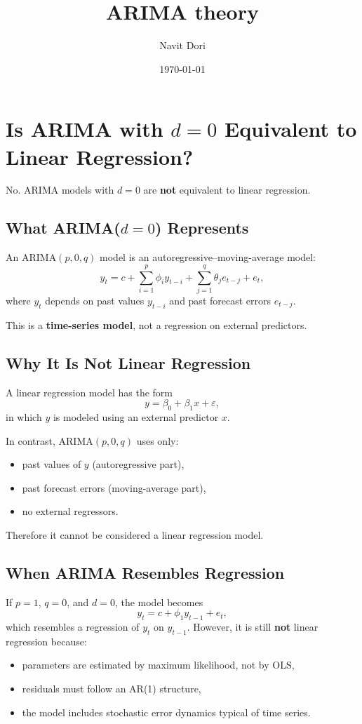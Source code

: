 \documentclass[12pt]{article}
\title{ARIMA theory}
\author{Navit Dori}
\date{\today}
\begin{document}
\maketitle
\section*{Is ARIMA with $d=0$ Equivalent to Linear Regression?}

No. ARIMA models with $d=0$ are \textbf{not} equivalent to linear regression.

\subsection*{What ARIMA($d=0$) Represents}

An ARIMA$(p,0,q)$ model is an autoregressive--moving-average model:
\[
y_t = c + \sum_{i=1}^{p} \phi_i y_{t-i} + \sum_{j=1}^{q} \theta_j e_{t-j} + e_t,
\]
where $y_t$ depends on past values $y_{t-i}$ and past forecast errors $e_{t-j}$.

This is a \textbf{time-series model}, not a regression on external predictors.

\subsection*{Why It Is Not Linear Regression}

A linear regression model has the form
\[
y = \beta_0 + \beta_1 x + \varepsilon,
\]
in which $y$ is modeled using an external predictor $x$.

In contrast, ARIMA$(p,0,q)$ uses only:
\begin{itemize}
    \item past values of $y$ (autoregressive part),
    \item past forecast errors (moving-average part),
    \item no external regressors.
\end{itemize}

Therefore it cannot be considered a linear regression model.

\subsection*{When ARIMA Resembles Regression}

If $p=1$, $q=0$, and $d=0$, the model becomes
\[
y_t = c + \phi_1 y_{t-1} + e_t,
\]
which resembles a regression of $y_t$ on $y_{t-1}$.  
However, it is still \textbf{not} linear regression because:
\begin{itemize}
    \item parameters are estimated by maximum likelihood, not by OLS,
    \item residuals must follow an AR(1) structure,
    \item the model includes stochastic error dynamics typical of time series.
\end{itemize}
\end{document}
